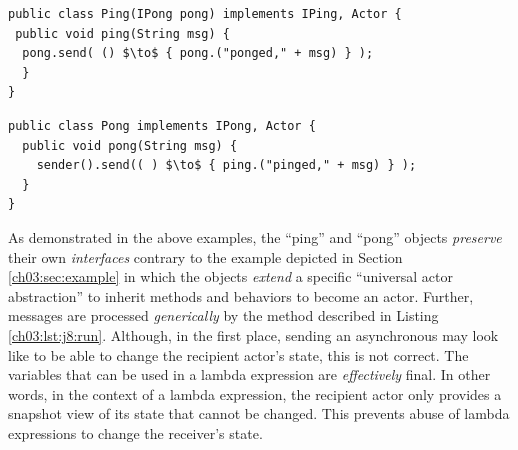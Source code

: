 \begin{center}
\begin{minipage}[t]{0.48\textwidth}
\begin{lstlisting}[mathescape, caption=Ping as an Actor,label=ch03:lst:ping]
public class Ping(IPong pong) implements IPing, Actor {
 public void ping(String msg) {
  pong.send( () $\to$ { pong.("ponged," + msg) } );
  }
}
\end{lstlisting}
\end{minipage}
\hfill
\begin{minipage}[t]{0.48\textwidth}
\begin{lstlisting}[mathescape, caption=Pong as an Actor,label=ch03:lst:pong]
public class Pong implements IPong, Actor {
  public void pong(String msg) {
    sender().send(( ) $\to$ { ping.("pinged," + msg) } );
  }
}
\end{lstlisting}
\end{minipage}
\end{center}

% 
As demonstrated in the above examples, the ``ping'' and ``pong'' objects \emph{preserve} 
their own \emph{interfaces}  contrary to the example depicted in Section \ref{ch03:sec:example} 
in which the objects \emph{extend} a specific ``universal actor abstraction'' to inherit methods and behaviors to become an actor.
Further,  messages are processed \emph{generically} by the  method described in Listing \ref{ch03:lst:j8:run}.
Although, in the first place, sending an asynchronous may look like to be able to change the recipient actor's state, this is not correct.
The variables that can be used in a lambda expression are \emph{effectively} final. 
In other words, in the context of a lambda expression, the recipient actor only provides a snapshot view of its state that cannot be changed.
This prevents abuse of lambda expressions to change the receiver's state.

% 


